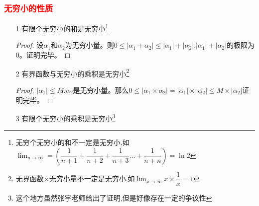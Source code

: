 \documentclass[8pt a4paper, oneside, UTF8]{ctexbook}
\begin{document}
\begin{sloppypar}
    \subsubsection{\textcolor{red}{无穷小的性质}}
    \begin{itemize}
        \item[1] 有限个无穷小的和是无穷小\footnote{无穷个无穷小的和不一定是无穷小,如$\lim_{n \to \infty}=(\dfrac{1}{n+1}+\dfrac{1}{n+2}+\dfrac{1}{n+3}\dots +\dfrac{1}{n+n})=\ln 2$}
            \begin{proof}
                设$\alpha_1$和$\alpha_2$为无穷小量。则$0 \leqslant |\alpha_1+\alpha_2|\leqslant |\alpha_1|+|\alpha_2|$,$|\alpha_1|+|\alpha_2|$的极限为0。证明完毕。
            \end{proof}
        \item[2] 有界函数与无穷小的乘积是无穷小\footnote{无界函数$\times$无穷小量不一定是无穷小,如$\lim_{x \to \infty}x \times \dfrac{1}{x}=1$}
            \begin{proof}
                $|\alpha _1|\leqslant M$,$\alpha_2$是无穷小量。那么$0\leqslant|\alpha_1 \times \alpha_2|=|\alpha_1|\times |\alpha_2|\leqslant M \times |\alpha_2|$证明完毕。
            \end{proof}
        \item[3] 有限个无穷小的乘积是无穷小\footnote{这个地方虽然张宇老师给出了证明,但是好像存在一定的争议性}
    \end{itemize}

\end{sloppypar}
\end{document}
